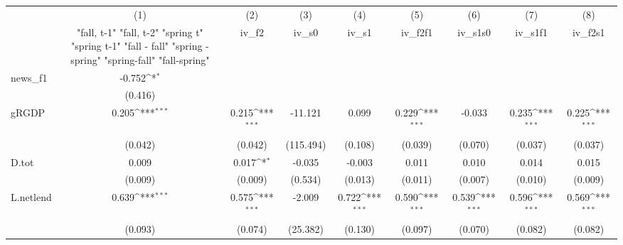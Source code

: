 {
\def\sym#1{\ifmmode^{#1}\else\(^{#1}\)\fi}
\begin{tabular}{l*{8}{c}}
\toprule
            &\multicolumn{1}{c}{(1)}&\multicolumn{1}{c}{(2)}&\multicolumn{1}{c}{(3)}&\multicolumn{1}{c}{(4)}&\multicolumn{1}{c}{(5)}&\multicolumn{1}{c}{(6)}&\multicolumn{1}{c}{(7)}&\multicolumn{1}{c}{(8)}\\
            &\multicolumn{1}{c}{  "fall, t-1" "fall, t-2" "spring t" "spring t-1"  "fall - fall" "spring - spring" "spring-fall" "fall-spring" }&\multicolumn{1}{c}{iv\_f2}&\multicolumn{1}{c}{iv\_s0}&\multicolumn{1}{c}{iv\_s1}&\multicolumn{1}{c}{iv\_f2f1}&\multicolumn{1}{c}{iv\_s1s0}&\multicolumn{1}{c}{iv\_s1f1}&\multicolumn{1}{c}{iv\_f2s1}\\
\midrule
news\_f1     &      -0.752\sym{*}  &                     &                     &                     &                     &                     &                     &                     \\
            &     (0.416)         &                     &                     &                     &                     &                     &                     &                     \\
\addlinespace
gRGDP       &       0.205\sym{***}&       0.215\sym{***}&     -11.121         &       0.099         &       0.229\sym{***}&      -0.033         &       0.235\sym{***}&       0.225\sym{***}\\
            &     (0.042)         &     (0.042)         &   (115.494)         &     (0.108)         &     (0.039)         &     (0.070)         &     (0.037)         &     (0.037)         \\
\addlinespace
D.tot       &       0.009         &       0.017\sym{*}  &      -0.035         &      -0.003         &       0.011         &       0.010         &       0.014         &       0.015         \\
            &     (0.009)         &     (0.009)         &     (0.534)         &     (0.013)         &     (0.011)         &     (0.007)         &     (0.010)         &     (0.009)         \\
\addlinespace
L.netlend   &       0.639\sym{***}&       0.575\sym{***}&      -2.009         &       0.722\sym{***}&       0.590\sym{***}&       0.539\sym{***}&       0.596\sym{***}&       0.569\sym{***}\\
            &     (0.093)         &     (0.074)         &    (25.382)         &     (0.130)         &     (0.097)         &     (0.070)         &     (0.082)         &     (0.082)         \\

\end{tabular}}
